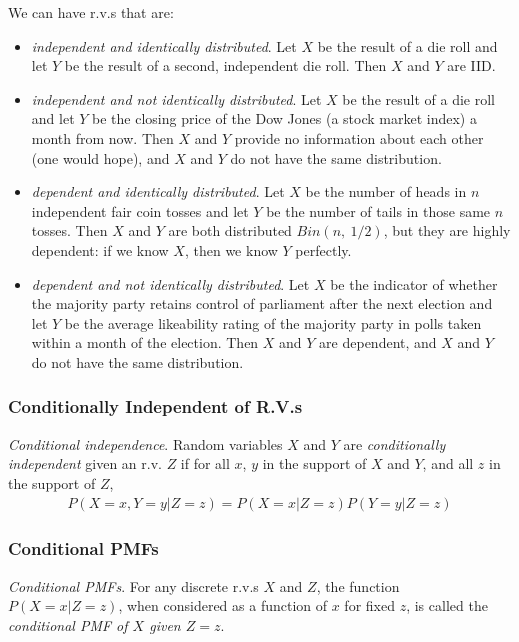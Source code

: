 \documentclass[11pt,a4paper]{article}
\begin{document}
We can have r.v.s that are:
\begin{itemize}
\item
\emph{independent and identically distributed}. 
Let \(X\) be the result of a die roll and let \(Y\) be the result of a second,
independent die roll. 
Then \(X\) and \(Y\) are IID.
\item
\emph{independent and not identically distributed}. 
Let \(X\) be the result of a die roll and let \(Y\) be 
the closing price of the Dow Jones (a stock market index) a month from now. 
Then \(X\) and \(Y\) provide no information about each other (one would hope),
and \(X\) and \(Y\) do not have the same distribution.
\item
\emph{dependent and identically distributed}. 
Let \(X\) be the number of heads in \(n\) independent fair coin tosses 
and let \(Y\) be the number of tails in those same \(n\) tosses. 
Then \(X\) and \(Y\) are both distributed \(Bin(n,\ 1/2)\), 
but they are highly dependent: if we know \(X\), 
then we know \(Y\) perfectly.
\item
\emph{dependent and not identically distributed}. 
Let \(X\) be the indicator of whether the majority party retains control of parliament
after the next election and 
let \(Y\) be the average likeability rating of the majority party in polls 
taken within a month of the election. 
Then \(X\) and \(Y\) are dependent, 
and \(X\) and \(Y\) do not have the same distribution.
\end{itemize}

\subsubsection{Conditionally Independent of R.V.s}

\emph{Conditional independence}. 
Random variables \(X\) and \(Y\) are \emph{conditionally independent} given an r.v. \(Z\) if for
all \(x\), \(y\) in the support of \(X\) and \(Y\), and all \(z\) in the support of \(Z\),
\begin{align}
P\left( X = x,Y = y | Z = z \right) = P\left( X = x | Z = z \right)P(Y = y|Z = z)
\end{align}

\subsubsection{Conditional PMFs}

\emph{Conditional PMFs}. 
For any discrete r.v.s \(X\) and \(Z\), 
the function \(P(X = x|Z = z)\), 
when considered as a function of \(x\) for fixed \(z\), 
is called the \emph{conditional PMF of \(X\) given \(Z = z\)}.
\end{document}
